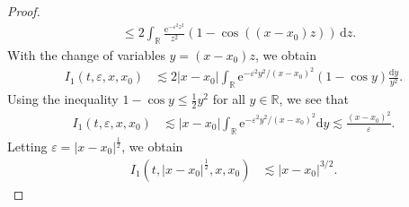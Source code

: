 \documentclass[12pt,a4paper]{article}
\newcommand{\R}{{\mathbb{R}}}
\renewcommand{\d}{\mathrm{d}}
\newcommand {\ep}{{\varepsilon}}
\newcommand {\half}{\frac 12}
\newcommand{\<}{\langle}
\renewcommand{\>}{\rangle}
\newcommand{\e}{\mathrm{e}}
\begin{document}
\begin{proof}
\begin{align*}
            &\leq 2\int_\R \frac{\e^{-\varepsilon^2 z^2}}{z^2} (1- \cos((x-x_0)z))\, \d z.
\end{align*}
With the change of variables $y = (x-x_0) z$, we obtain
 \begin{align*}
           I_1(t, \varepsilon, x, x_0) &\lesssim 2 |x-x_0|  \int_\R \e^{- \ep^2y^2/(x-x_0)^2} \left(1 - \cos y\right) \frac{\d y}{y^2} .
 \end{align*}           
Using the inequality $1-\cos y \leq \frac12 y^2$ for all $y\in \R$, we see that
\begin{align*}%
           I_1(t, \varepsilon, x, x_0) &\lesssim  |x-x_0| \int_\R \e^{-\varepsilon^2 y^2/(x-x_0)^2} \d y \lesssim \frac{(x-x_0)^2}{\ep} .         
\end{align*}
Letting $\varepsilon = |x-x_0|^\half$,  we obtain 
\begin{align}\label{eq:I1}
   I_1(t, |x-x_0|^\half, x, x_0) &\lesssim  |x-x_0|^{3/2}.
\end{align}


\end{proof}
\end{document}
